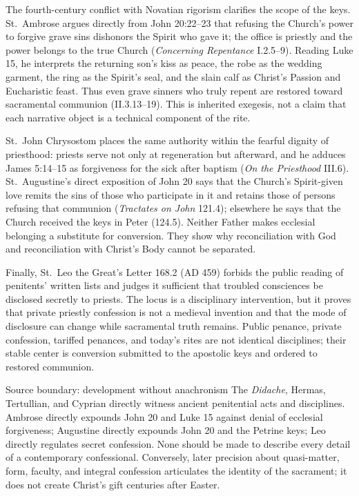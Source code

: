 The fourth-century conflict with Novatian rigorism clarifies the scope of the keys. St.~Ambrose argues directly from John 20:22--23 that refusing the Church's power to forgive grave sins dishonors the Spirit who gave it; the office is priestly and the power belongs to the true Church (\emph{Concerning Repentance} I.2.5--9). Reading Luke 15, he interprets the returning son's kiss as peace, the robe as the wedding garment, the ring as the Spirit's seal, and the slain calf as Christ's Passion and Eucharistic feast. Thus even grave sinners who truly repent are restored toward sacramental communion (II.3.13--19). This is inherited exegesis, not a claim that each narrative object is a technical component of the rite.

St.~John Chrysostom places the same authority within the fearful dignity of priesthood: priests serve not only at regeneration but afterward, and he adduces James 5:14--15 as forgiveness for the sick after baptism (\emph{On the Priesthood} III.6). St.~Augustine's direct exposition of John 20 says that the Church's Spirit-given love remits the sins of those who participate in it and retains those of persons refusing that communion (\emph{Tractates on John} 121.4); elsewhere he says that the Church received the keys in Peter (124.5). Neither Father makes ecclesial belonging a substitute for conversion. They show why reconciliation with God and reconciliation with Christ's Body cannot be separated.

Finally, St.~Leo the Great's Letter 168.2 (AD 459) forbids the public reading of penitents' written lists and judges it sufficient that troubled consciences be disclosed secretly to priests. The locus is a disciplinary intervention, but it proves that private priestly confession is not a medieval invention and that the mode of disclosure can change while sacramental truth remains. Public penance, private confession, tariffed penances, and today's rites are not identical disciplines; their stable center is conversion submitted to the apostolic keys and ordered to restored communion.

\begin{studybox}{Source boundary: development without anachronism}
The \emph{Didache}, Hermas, Tertullian, and Cyprian directly witness ancient penitential acts and disciplines. Ambrose directly expounds John 20 and Luke 15 against denial of ecclesial forgiveness; Augustine directly expounds John 20 and the Petrine keys; Leo directly regulates secret confession. None should be made to describe every detail of a contemporary confessional. Conversely, later precision about quasi-matter, form, faculty, and integral confession articulates the identity of the sacrament; it does not create Christ's gift centuries after Easter.
\end{studybox}

